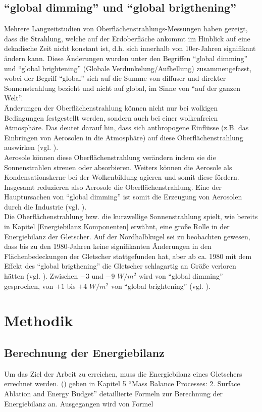 \documentclass[11pt,a4paper]{article}
\begin{document}
\subsection{``global dimming'' und ``global brigthening''}
Mehrere Langzeitstudien von Oberflächenstrahlungs-Messungen haben gezeigt, dass die Strahlung, welche auf der Erdoberfläche ankommt im Hinblick auf eine dekadische Zeit nicht konstant ist, d.h. sich innerhalb von 10er-Jahren signifikant ändern kann. Diese Änderungen wurden unter den Begriffen ``global dimming'' und ``global brightening'' (Globale Verdunkelung/Aufhellung) zusammengefasst, wobei der Begriff ``global'' sich auf die Summe von diffuser und direkter Sonnenstrahlung bezieht und nicht auf global, im Sinne von ``auf der ganzen Welt''.\\
Änderungen der Oberflächenstrahlung können nicht nur bei wolkigen Bedingungen festgestellt werden, sondern auch bei einer wolkenfreien Atmosphäre. Das deutet darauf hin, dass sich anthropogene Einflüsse (z.B. das Einbringen von Aerosolen in die Atmosphäre) auf diese Oberflächenstrahlung auswirken (vgl. \cite[1]{GlobalDimming}).\\
Aerosole können diese Oberflächenstrahlung verändern indem sie die Sonnenstrahlen streuen oder absorbieren. Weiters können die Aerosole als Kondensationskerne bei der Wolkenbildung agieren und somit diese fördern. Insgesamt reduzieren also Aerosole die Oberflächenstrahlung. Eine der Hauptursachen von ``global dimming'' ist somit die Erzeugung von Aerosolen durch die Industrie (vgl. \cite[14]{GlobalDimming}).\\ 
Die Oberflächenstrahlung bzw. die kurzwellige Sonnenstrahlung spielt, wie bereits in Kapitel \ref{Energiebilanz Komponenten} erwähnt, eine große Rolle in der Energiebilanz der Gletscher. Auf der Nordhalbkugel sei zu beobachten gewesen, dass bis zu den 1980-Jahren keine signifikanten Änderungen in den Flächenbedeckungen der Gletscher stattgefunden hat, aber ab ca. 1980 mit dem Effekt des ``global brigthening'' die Gletscher schlagartig an Größe verloren hätten (vgl. \cite[24]{GlobalDimming}). Zwischen $-3$ und $-9$ $W/m^2$ wird von ``global dimming'' gesprochen, von $+1$ bis $+4$ $W/m^2$ von ``global brightening'' (vgl. \cite[28]{EnlighteningGlobalDimming}).


\pagebreak
\section{Methodik}
\subsection{Berechnung der Energiebilanz}
Um das Ziel der Arbeit zu erreichen, muss die Energiebilanz eines Gletschers errechnet werden. \citeauthor{ThePhysicsOfGlaciers} (\citeyear{ThePhysicsOfGlaciers}) geben in Kapitel 5 ``Mass Balance Processes: 2. Surface Ablation and Energy Budget'' detaillierte Formeln zur Berechnung der Energiebilanz an. Ausgegangen wird von Formel 
\end{document}
